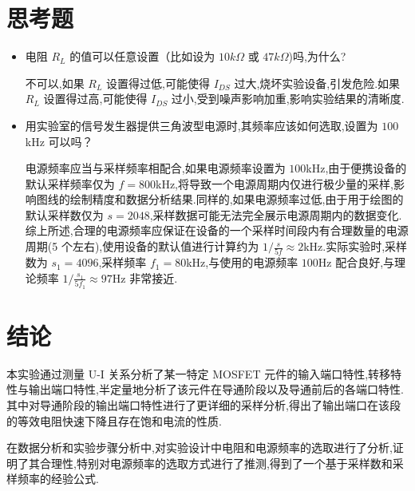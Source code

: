     \section{思考题}
        \begin{itemize}
            \item 电阻 $R_{L}$ 的值可以任意设置（比如设为 $10k\Omega$ 或 $47k\Omega$)吗,为什么?

                不可以,如果 $R_{L}$ 设置得过低,可能使得 $I_{DS}$ 过大,烧坏实验设备,引发危险.如果 $R_{L}$ 设置得过高,可能使得 $I_{DS}$ 过小,受到噪声影响加重,影响实验结果的清晰度.
            \item 用实验室的信号发生器提供三角波型电源时,其频率应该如何选取,设置为 $100$kHz 可以吗？

                电源频率应当与采样频率相配合,如果电源频率设置为 $100$kHz,由于便携设备的默认采样频率仅为 $f=800$kHz,将导致一个电源周期内仅进行极少量的采样,影响图线的绘制精度和数据分析结果.同样的,如果电源频率过低,由于用于绘图的默认采样数仅为 $s=2048$,采样数据可能无法完全展示电源周期内的数据变化.综上所述,合理的电源频率应保证在设备的一个采样时间段内有合理数量的电源周期(5 个左右),使用设备的默认值进行计算约为 $1/\frac{s}{5f}\approx 2$kHz.实际实验时,采样数为 $s_1=4096$,采样频率 $f_1=80$kHz,与使用的电源频率 $100$Hz 配合良好,与理论频率 $1 / \frac{s_1}{5f_1}\approx 97$Hz 非常接近.
        \end{itemize}
    \section{结论}
        本实验通过测量 U-I 关系分析了某一特定 MOSFET 元件的输入端口特性,转移特性与输出端口特性,半定量地分析了该元件在导通阶段以及导通前后的各端口特性.其中对导通阶段的输出端口特性进行了更详细的采样分析,得出了输出端口在该段的等效电阻快速下降且存在饱和电流的性质.

        在数据分析和实验步骤分析中,对实验设计中电阻和电源频率的选取进行了分析,证明了其合理性,特别对电源频率的选取方式进行了推测,得到了一个基于采样数和采样频率的经验公式.

